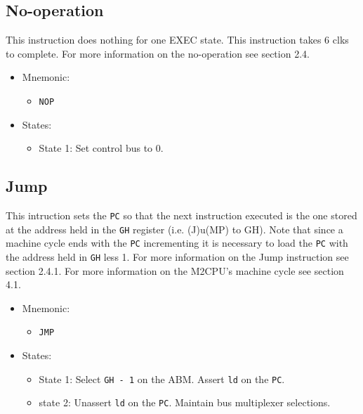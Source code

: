 \documentclass[a4paper,12pt]{article}
\newcommand{\mt}{M2CPU}
\newcommand{\Gr}{\texttt{G}}
\newcommand{\Hr}{\texttt{H}}
\newcommand{\PC}{\texttt{PC}}
\begin{document}
\subsection{No-operation}
This instruction does nothing for one EXEC state. This instruction takes 6 clks
to complete. For more information on the no-operation see section 2.4.
\begin{itemize}
\item Mnemonic:
\begin{itemize}
	\item \texttt{NOP}
\end{itemize}
\item States:
\begin{itemize}
	\item State 1: Set control bus to 0.
\end{itemize}
\end{itemize}

\subsection{Jump}
This intruction sets the \PC{} so that the next instruction executed is the one
stored at the address held in the \Gr{}\Hr{} register (i.e. (J)u(MP) to GH).
Note that since a machine cycle ends with the \PC{} incrementing it is 
necessary to load the \PC{} with the address held in \Gr{}\Hr{} less 1. For 
more information on the Jump instruction see section 2.4.1. For more 
information on the \mt{}'s machine cycle see section 4.1.
\par

\begin{itemize}
\item Mnemonic:
\begin{itemize}
	\item \texttt{JMP}
\end{itemize}
\item States:
\begin{itemize}
	\item State 1: Select \texttt{GH - 1} on the ABM. Assert \texttt{ld} on
	the \PC{}.
	\item state 2: Unassert \texttt{ld} on the \PC{}. Maintain bus 
	multiplexer selections.
\end{itemize}
\end{itemize}
\end{document}
